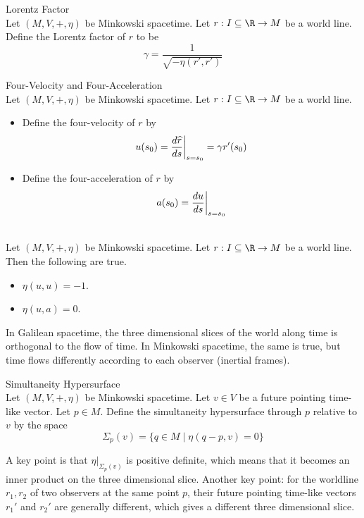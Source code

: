 \documentclass[a4paper]{article}
\begin{document}
\begin{defn}{Lorentz Factor}{}\\
Let $(M,V,+,\eta)$ be Minkowski spacetime. Let $r:I\subseteq\R\to M$ be a world line. Define the Lorentz factor of $r$ to be $$\gamma=\frac{1}{\sqrt{-\eta(r',r')}}$$
\end{defn}

\begin{defn}{Four-Velocity and Four-Acceleration}{}\\
Let $(M,V,+,\eta)$ be Minkowski spacetime. Let $r:I\subseteq\R\to M$ be a world line. 
\begin{itemize}
\item Define the four-velocity of $r$ by $$u(s_0)=\frac{d\widehat{r}}{ds}\bigg{|}_{s=s_0}=\gamma r'(s_0)$$
\item Define the four-acceleration of $r$ by $$a(s_0)=\frac{du}{ds}\bigg{|}_{s=s_0}$$
\end{itemize}
\end{defn}

\begin{prp}{}{}\\
Let $(M,V,+,\eta)$ be Minkowski spacetime. Let $r:I\subseteq\R\to M$ be a world line. Then the following are true. 
\begin{itemize}
\item $\eta(u,u)=-1$. 
\item $\eta(u,a)=0$. 
\end{itemize}
\end{prp}

In Galilean spacetime, the three dimensional slices of the world along time is orthogonal to the flow of time. In Minkowski spacetime, the same is true, but time flows differently according to each observer (inertial frames). 

\begin{defn}{Simultaneity Hypersurface}{}\\
Let $(M,V,+,\eta)$ be Minkowski spacetime. Let $v\in V$ be a future pointing time-like vector. Let $p\in M$. Define the simultaneity hypersurface through $p$ relative to $v$ by the space $$\Sigma_p(v)=\{q\in M\;|\;\eta(q-p,v)=0\}$$
\end{defn}

A key point is that $\eta|_{\Sigma_p(v)}$ is positive definite, which means that it becomes an inner product on the three dimensional slice. Another key point: for the worldline $r_1,r_2$ of two observers at the same point $p$, their future pointing time-like vectors $r_1'$ and $r_2'$ are generally different, which gives a different three dimensional slice. 
\end{document}
